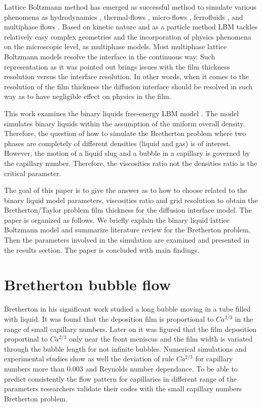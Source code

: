 \documentclass{article}
\begin{document}
Lattice Boltzmann method has emerged as successful method to simulate various
phenomena as hydrodynamics \cite{yu}, thermal-flows
\cite{karlin-minimalmodels}, micro-flows \cite{ansumali-small-knudsen},
ferrofluids \cite{kuzmin-aniso}, and multiphase flows
\cite{swift,Shan-chen:extended}. Based on kinetic nature and as a particle
method LBM tackles relatively easy complex geometries and the incorporation of
physics phenomena on the microscopic level, as multiphase models. Most
multiphase lattice Boltzmann models \cite{swift, Shan-chen:extended} resolve
the interface in the continuous way. Such representation as it was pointed out
brings issues with the film thickness resolution versus the interface
resolution. In other words, when it comes to the resolution of the film
thickness the diffusion interface should be resolved in such way as to have
negligible effect on physics in the film. 

This work examines the binary liquids free-energy LBM model \cite{swift}. The
model simulates binary liquids within the assumption of the uniform overall
density. Therefore, the question of how to simulate the Bretherton problem
where two phases are completely of different densities (liquid and gas) is of
interest. However, the motion of a liquid slug and a bubble in a capillary is
governed by the capillary number. Therefore, the viscosities ratio not the
densities ratio is the critical parameter. 

The goal of this paper is to give the answer as to how to choose related to the
binary liquid model parameters, viscosities ratio and grid
resolution to obtain the Bretherton/Taylor problem film thickness for the
diffusion interface model. The paper is organized as follows. We briefly
explain the binary liquid lattice Boltzmann model and summarize literature
review for the Bretherton problem. Then the parameters involved in the
simulation are examined and presented in the results section. The paper is
concluded with main findings.

\section{Bretherton bubble flow}
Bretherton in his significant work \cite{bretherton} studied a long bubble
moving in a tube filled with liquid. It was found that the deposition film is
proportional to $Ca^{2/3}$ in the range of small capillary numbers. Later on
it was figured \cite{wong-films,wong-pressure} that the film deposition
proportinal to $Ca^{2/3}$ only near the front meniscus and the film width is
variated through the bubble length for not infinite bubbles. Numerical
simulations \cite{giavedoni-numerical} and experimental studies
\cite{kreutzer-pressure-drop} show as well the deviation of rule $Ca^{2/3}$ for
capillary numbers more than $0.003$ and Reynolds number dependance. To be able
to predict consistently the flow pattern for capillaries in different range of
the parameters researchers validate their codes with the small capillary
numbers Bretherton problem.  
\end{document}

